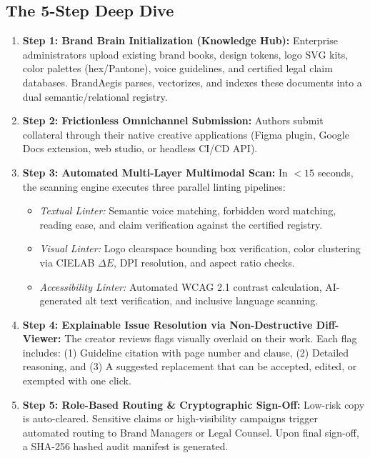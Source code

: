 \documentclass[10pt,a4paper]{article}
\begin{document}
\vspace{0.1cm}

\subsection{The 5-Step Deep Dive}
\begin{enumerate}[leftmargin=*,itemsep=2.5pt]
  \item \textbf{Step 1: Brand Brain Initialization (Knowledge Hub):} Enterprise administrators upload existing brand books, design tokens, logo SVG kits, color palettes (hex/Pantone), voice guidelines, and certified legal claim databases. BrandAegis parses, vectorizes, and indexes these documents into a dual semantic/relational registry.
  \item \textbf{Step 2: Frictionless Omnichannel Submission:} Authors submit collateral through their native creative applications (Figma plugin, Google Docs extension, web studio, or headless CI/CD API).
  \item \textbf{Step 3: Automated Multi-Layer Multimodal Scan:} In $<15$ seconds, the scanning engine executes three parallel linting pipelines:
    \begin{itemize}[leftmargin=*,itemsep=1pt]
      \item \textit{Textual Linter:} Semantic voice matching, forbidden word matching, reading ease, and claim verification against the certified registry.
      \item \textit{Visual Linter:} Logo clearspace bounding box verification, color clustering via CIELAB $\Delta E$, DPI resolution, and aspect ratio checks.
      \item \textit{Accessibility Linter:} Automated WCAG 2.1 contrast calculation, AI-generated alt text verification, and inclusive language scanning.
    \end{itemize}
  \item \textbf{Step 4: Explainable Issue Resolution via Non-Destructive Diff-Viewer:} The creator reviews flags visually overlaid on their work. Each flag includes: (1) Guideline citation with page number and clause, (2) Detailed reasoning, and (3) A suggested replacement that can be accepted, edited, or exempted with one click.
  \item \textbf{Step 5: Role-Based Routing \& Cryptographic Sign-Off:} Low-risk copy is auto-cleared. Sensitive claims or high-visibility campaigns trigger automated routing to Brand Managers or Legal Counsel. Upon final sign-off, a SHA-256 hashed audit manifest is generated.
\end{enumerate}
\end{document}
